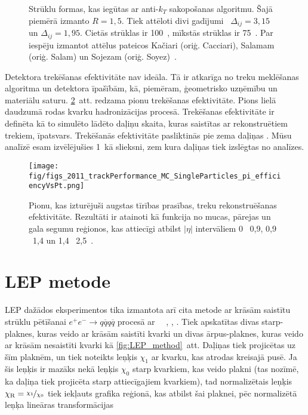 \begin{figure}[hbtp]
  \def\twidth{0.5}
  \hfil%
   \caption{Strūklu formas, kas iegūtas ar anti-$k_{T}$ sakopošanas algoritmu. Šajā piemērā izmanto $R=1,5$. Tiek attēloti divi gadījumi \textendash\ $\Delta_{ij}=3,15$ un  $\Delta_{ij}=1,95$. Cietās strūklas \pt ir 100~\GeV, mīkstās strūklas \pt ir 75~\GeV. Par iespēju izmantot attēlus pateicos Kačiari (oriģ. Cacciari), Salamam (oriģ. Salam) un Sojezam (oriģ. Soyez)~\cite{github:antikt}.}
  \label{fig:anti_kt}
\end{figure}

Detektora trekēšanas efektivitāte nav ideāla. Tā ir atkarīga no treku meklēšanas algoritma un detektora īpašībām, kā, piemēram, ģeometrisko \gls{uzņēmību} un materiālu saturu. \ref{fig:2011_trackPerformance_MC_SingleParticles_pi_efficiencyVsPt}~att. redzama pionu trekēšanas efektivitāte. Pions lielā daudzumā rodas kvarku hadronizācijas procesā. Trekēšanas efektivitāte ir definēta kā to simulēto lādēto daļiņu skaita, kuras saistītas ar rekonstruētiem trekiem, īpatsvars. Trekēšanās efektivitāte pasliktinās pie zema daļiņas \pt. Mūsu analīzē esam izvēlējušies 1~\GeV kā \pt slieksni, zem kura daļiņas tiek izslēgtas no analīzes.

\begin{figure}[hbtp]
  \centering
    \texttt{[image: fig/figs\_2011\_trackPerformance\_MC\_SingleParticles\_pi\_efficiencyVsPt.png]}
    \caption{Pionu, kas izturējuši augstas tīrības prasības, treku rekonstruēšanas efektivitāte. Rezultāti ir atainoti kā funkcija no \pt mucas, pārejas un gala segumu reģionos, kas attiecīgi atbilst $\left|\eta\right|$ intervāliem 0 \textendash\ 0,9, 0,9 \textendash\ 1,4 un 1,4 \textendash\ 2,5~\cite{Chatrchyan:2014fea}.}
    \label{fig:2011_trackPerformance_MC_SingleParticles_pi_efficiencyVsPt}
\end{figure}

\section{LEP metode}

LEP dažādos eksperimentos tika izmantota arī cita metode ar krāsām saistītu strūklu pētīšanai $e^{+}e^{-}\rightarrow q\overline{q}q\overline{q}$ procesā ar ~\GeV~\cite{Abdallah:2006uq}, \cite{Abbiendi:2005es}, \cite{Achard:2003pe}. Tiek apskatītas divas starp-\PW plaknes, kuras veido ar krāsām saistīti kvarki un divas ārpus-\PW plaknes, kuras veido ar krāsām nesaistīti kvarki kā \ref{fig:LEP_method}~att. Daļiņas tiek projicētas uz šīm plaknēm, un tiek noteikts leņķis $\chi_{1}$ ar kvarku, kas atrodas kreisajā pusē. Ja šis leņķis ir mazāks nekā leņķis $\chi_{0}$ starp kvarkiem, kas veido plakni (tas nozīmē, ka daļiņa tiek projicēta starp attiecīgajiem kvarkiem), tad normalizētais leņķis $\chi_{\text{R}}=\nicefrac{\chi_{1}}{\chi_{0}}$ tiek iekļauts grafika reģionā, kas atbilst šai plaknei, pēc normalizētā leņķa lineāras transformācijas

